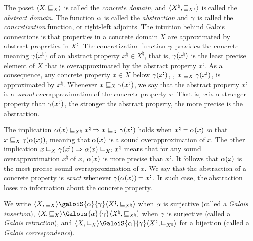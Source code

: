 The poset $\langle X, \sqsubseteq_X \rangle$ is called the \emph{concrete domain}, and $\langle {X^\natural}, \sqsubseteq_{X^\natural} \rangle$ is called the \emph{abstract domain}. The function $\alpha$ is called the \emph{abstraction} and $\gamma$ is called the \emph{concretization} function, or right-left adjoints.
The intuition behind Galois connections is that properties in a concrete domain $X$ are approximated by abstract properties in ${X^\natural}$.
The concretization function $\gamma$ provides the concrete meaning $\gamma({x^\natural})$ of an abstract property ${x^\natural}\in {X^\natural}$, that is, $\gamma({x^\natural})$ is the least precise element of $X$ that is overapproximated by the abstract property ${x^\natural}$. As a consequence, any concrete property $x\in X$ below $\gamma({x^\natural})$, \ie, $x \sqsubseteq_X \gamma({x^\natural})$, is approximated by ${x^\natural}$.
Whenever $x \sqsubseteq_X \gamma({x^\natural})$, we say that the abstract property ${x^\natural}$ is a \emph{sound} overapproximation of the concrete property $x$. That is, $x$ is a stronger property than $\gamma({x^\natural})$, the stronger the abstract property, the more precise is the abstraction.

The implication $\alpha(x) \sqsubseteq_{X^\natural} {x^\natural} \Rightarrow x \sqsubseteq_X \gamma({x^\natural})$ holds when ${x^\natural} = \alpha(x)$ so that $x \sqsubseteq_X \gamma(\alpha(x))$, meaning that $\alpha(x)$ is a sound overapproximation of $x$.
The other implication $x \sqsubseteq_X \gamma({x^\natural}) \Rightarrow \alpha(x) \sqsubseteq_{X^\natural} {x^\natural}$ means that for any sound overapproximation ${x^\natural}$ of $x$, $\alpha(x)$ is more precise than ${x^\natural}$. It follows that $\alpha(x)$ is the most precise sound overapproximation of $x$. We say that the abstraction of a concrete property is \emph{exact} whenever $\gamma(\alpha(x)) = {x^\natural}$. In such case, the abstraction loses no information about the concrete property.

We write $\tuple{X}{\sqsubseteq_X}\galoiS{\abstraction}{\concretization}\tuple{{X^\natural}}{\sqsubseteq_{X^\natural}}$ when $\alpha$ is surjective (called a \emph{Galois insertion}), $\tuple{X}{\sqsubseteq_X}\Galois{\abstraction}{\concretization}\tuple{{X^\natural}}{\sqsubseteq_{X^\natural}}$ when $\gamma$ is surjective (called a \emph{Galois retraction}), and $\tuple{X}{\sqsubseteq_X}\GaloiS{\abstraction}{\concretization}\tuple{{X^\natural}}{\sqsubseteq_{X^\natural}}$ for a bijection (called a \emph{Galois correspondence}).

